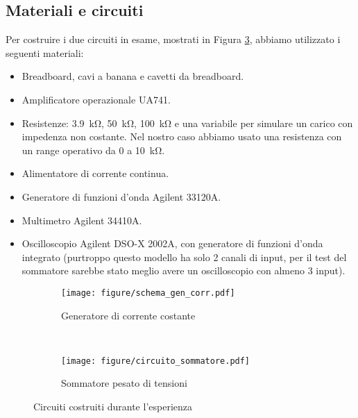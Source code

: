 \subsection{Materiali e circuiti}

Per costruire i due circuiti in esame, mostrati in Figura \ref{fig:circuits},
abbiamo utilizzato i seguenti materiali:

\begin{itemize}
    \item{Breadboard, cavi a banana e cavetti da breadboard.}
    \item{Amplificatore operazionale UA741.}
    \item{Resistenze: \SI{3.9}{\kilo\ohm}, \SI{50}{\kilo\ohm}, \SI{100}{\kilo\ohm}
        e una variabile per simulare un carico con impedenza non costante. Nel nostro caso abbiamo
        usato una resistenza con un range operativo da 0 a \SI{10}{\kilo\ohm}.}
    \item{Alimentatore di corrente continua.}
    \item{Generatore di funzioni d'onda Agilent 33120A.}
    \item{Multimetro Agilent 34410A.}
    \item{Oscilloscopio Agilent DSO-X 2002A, con generatore di funzioni d'onda integrato
        (purtroppo questo modello ha solo 2 canali di input,
        per il test del sommatore sarebbe stato meglio avere un oscilloscopio con almeno 3 input).}
\end{itemize}

\begin{figure}[h]
        \centering
        \begin{subfigure}[b]{0.48\textwidth}
                \texttt{[image: figure/schema\_gen\_corr.pdf]}
                \caption{Generatore di corrente costante}
                \label{fig:generatore}
        \end{subfigure}
        ~
        \begin{subfigure}[b]{0.48\textwidth}
                \texttt{[image: figure/circuito\_sommatore.pdf]}
                \caption{Sommatore pesato di tensioni}
                \label{fig:sommatore}
        \end{subfigure}
        \caption{Circuiti costruiti durante l'esperienza}
        \label{fig:circuits}
\end{figure}

